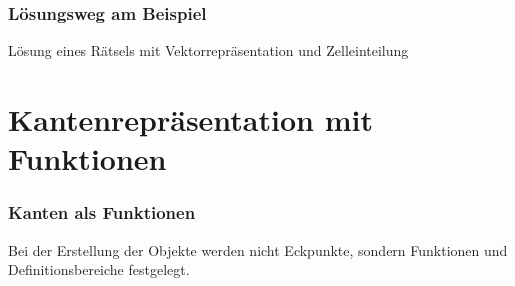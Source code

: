 \documentclass[final]{beamer}
\begin{document}
\begin{frame}
\frametitle{Lösungsweg am Beispiel}
Lösung eines Rätsels mit Vektorrepräsentation und Zelleinteilung\\
\begin{figure}
\centering
{}
\end{figure}
\end{frame}

\section{Kantenrepräsentation mit Funktionen}

\begin{frame}
\frametitle{Kanten als Funktionen}
Bei der Erstellung der Objekte werden nicht Eckpunkte, sondern Funktionen und Definitionsbereiche festgelegt.
\end{frame}
\end{document}
